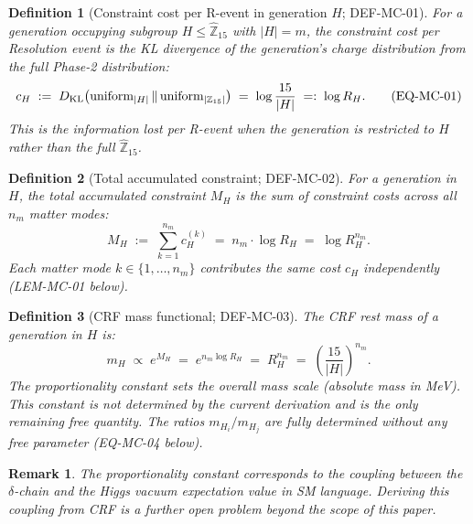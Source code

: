 \documentclass[12pt, a4paper]{article}
\newtheorem{definition}{Definition}[section]
\newtheorem{remark}{Remark}[section]
\begin{document}
\begin{definition}[Constraint cost per R-event in generation $H$;
  DEF-MC-01]
\label{zc16:def:cost-per-event}
For a generation occupying subgroup $H \leq \widehat{\mathbb{Z}}_{15}$
with $|H| = m$, the \emph{constraint cost per Resolution event}
is the KL divergence of the generation's charge distribution
from the full Phase-2 distribution:
\begin{equation}
  c_H \;:=\;
  D_{\rm KL}\!\left(\text{uniform}_{|H|}
  \,\|\, \text{uniform}_{|\mathbb{Z}_{15}|}\right)
  \;=\; \log\frac{15}{|H|}
  \;=:\; \log R_H.
  \tag{EQ-MC-01}\label{zc16:eq:cost-per-event}
\end{equation}
This is the information lost per R-event when the generation
is restricted to $H$ rather than the full $\widehat{\mathbb{Z}}_{15}$.
\end{definition}

\begin{definition}[Total accumulated constraint; DEF-MC-02]
\label{zc16:def:total-constraint}
For a generation in $H$, the \emph{total accumulated constraint}
$M_H$ is the sum of constraint costs across all $n_m$ matter modes:
\begin{equation}
  M_H \;:=\; \sum_{k=1}^{n_m} c_H^{(k)}
  \;=\; n_m \cdot \log R_H
  \;=\; \log R_H^{n_m}.
  \tag{EQ-MC-02}\label{zc16:eq:total-constraint}
\end{equation}
Each matter mode $k \in \{1,\ldots,n_m\}$ contributes the same
cost $c_H$ independently (LEM-MC-01 below).
\end{definition}

\begin{definition}[CRF mass functional; DEF-MC-03]
\label{zc16:def:mass-functional}
The \emph{CRF rest mass} of a generation in $H$ is:
\begin{equation}
  m_H \;\propto\; e^{M_H}
  \;=\; e^{n_m \log R_H}
  \;=\; R_H^{n_m}
  \;=\; \left(\frac{15}{|H|}\right)^{n_m}.
  \tag{EQ-MC-03}\label{zc16:eq:mass-functional}
\end{equation}
The proportionality constant sets the overall mass scale
(absolute mass in MeV). This constant is not determined by
the current derivation and is the only remaining free quantity.
The \emph{ratios} $m_{H_i}/m_{H_j}$ are fully determined
without any free parameter (EQ-MC-04 below).
\end{definition}

\begin{remark}
The proportionality constant corresponds to the coupling between
the $\delta$-chain and the Higgs vacuum expectation value in SM
language. Deriving this coupling from CRF is a further open
problem beyond the scope of this paper.
\end{remark}
\end{document}
